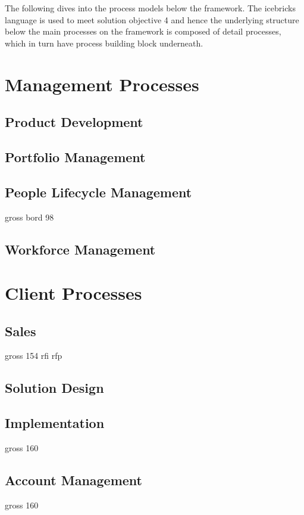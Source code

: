 	 The following dives into the process models below the framework. The icebricks language is used to meet solution objective 4 and hence the underlying structure below the main processes on the framework is composed of detail processes, which in turn have process building block underneath. 
	 
	\section{Management Processes}
	\subsection{Product Development}
	
	\subsection{Portfolio Management}
	
	\subsection{People Lifecycle Management}
	gross bord 98
	
	\subsection{Workforce Management}
	
	\section{Client Processes}
	\subsection{Sales}
	gross 154 rfi rfp
	\subsection{Solution Design}
	\subsection{Implementation}
	gross 160
	\subsection{Account Management}
	gross 160
